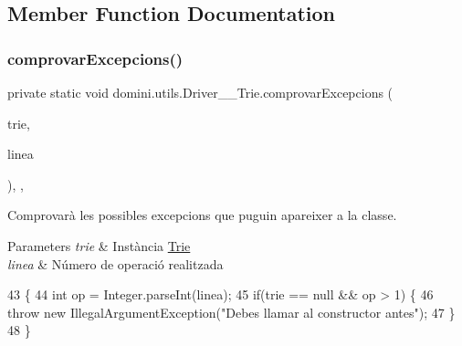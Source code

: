 \subsection{Member Function Documentation}
\mbox{\label{classdomini_1_1utils_1_1Driver____Trie_a6fd273250b3951144ce3a76f26330ab1}} 
\subsubsection{\texorpdfstring{comprovar\+Excepcions()}{comprovarExcepcions()}}
{\footnotesize\ttfamily private static void domini.\+utils.\+Driver\+\_\+\+\_\+\+Trie.\+comprovar\+Excepcions (\begin{DoxyParamCaption}\item[{\hyperlink{classdomini_1_1utils_1_1Trie}{Trie}$<$ Byte $>$}]{trie,  }\item[{String}]{linea }\end{DoxyParamCaption})\hspace{0.3cm}{\ttfamily [inline]}, {\ttfamily [static]}, {\ttfamily [private]}}



Comprovarà les possibles excepcions que puguin apareixer a la classe. 


\begin{DoxyParams}{Parameters}
{\em trie} & Instància \hyperlink{classdomini_1_1utils_1_1Trie}{Trie} \\
\hline
{\em linea} & Número de operació realitzada \\
\hline
\end{DoxyParams}

\begin{DoxyCode}
43                                                                           \{
44         \textcolor{keywordtype}{int} op = Integer.parseInt(linea);
45         \textcolor{keywordflow}{if}(trie == null && op > 1) \{
46             \textcolor{keywordflow}{throw} \textcolor{keyword}{new} IllegalArgumentException(\textcolor{stringliteral}{"Debes llamar al constructor antes"});
47         \}
48     \}
\end{DoxyCode}
\mbox{\label{classdomini_1_1utils_1_1Driver____Trie_a00769a23a8d74a6f4bc05c19a2bd8519}} 

